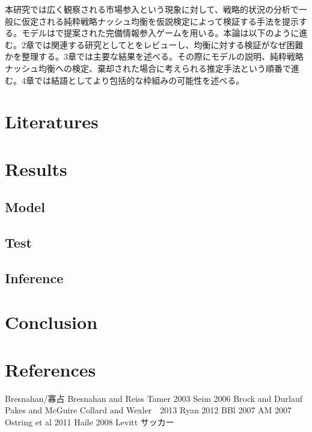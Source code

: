 \documentclass{jsarticle}
\begin{document}
本研究では広く観察される市場参入という現象に対して、戦略的状況の分析で一般に仮定される純粋戦略ナッシュ均衡を仮説検定によって検証する手法を提示する。モデルは\cite{2}で提案された完備情報参入ゲームを用いる。本論は以下のように進む。2章では関連する研究として\cite{11}と\cite{13}をレビューし、均衡に対する検証がなぜ困難かを整理する。3章では主要な結果を述べる。その際にモデルの説明、純粋戦略ナッシュ均衡への検定、棄却された場合に考えられる推定手法という順番で進む。4章では結語としてより包括的な枠組みの可能性を述べる。



\section{Literatures}

\section{Results}
\subsection{Model}

\subsection{Test}

\subsection{Inference}

\section{Conclusion}

\section{References}
\begin{thebibliography}{10}
	 Bresnahan/寡占
	 Bresnahan and Reiss
	 Tamer 2003
	 Seim 2006
	 Brock and Durlauf
	 Pakes and McGuire
	 Collard and Wexler　2013
	 Ryan 2012
	 BBl 2007
	 AM 2007
	 Ostring et al 2011
	 Haile 2008
	 Levitt サッカー
\end{thebibliography}
\end{document}
